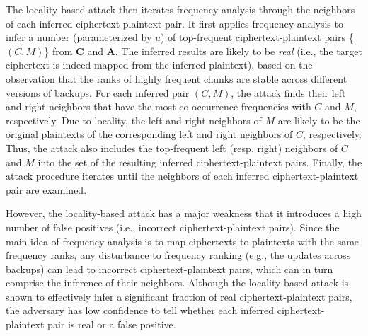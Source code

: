 \documentclass[bachelor]{thesis-uestc}
\begin{document}
The locality-based attack then iterates frequency analysis through the
neighbors of each inferred ciphertext-plaintext pair.  It first applies
frequency analysis to infer a number (parameterized by $u$) of top-frequent
ciphertext-plaintext pairs \{$(C, M)$\} from $\mathbf{C}$ and $\mathbf{A}$.
The inferred results are likely to be {\em real} (i.e., the target ciphertext
is indeed mapped from the inferred plaintext), based on the observation that
the ranks of highly frequent chunks are stable across different versions of
backups.  For each inferred pair $(C, M)$, the attack finds their left and
right neighbors that have the most co-occurrence frequencies with $C$ and $M$,
respectively.  Due to locality, the left and right neighbors of $M$ are likely
to be the original plaintexts of the corresponding left and right neighbors of
$C$, respectively.  Thus, the attack also includes the top-frequent left
(resp. right) neighbors of $C$ and $M$ into the set of the resulting inferred
ciphertext-plaintext pairs.  Finally, the attack procedure iterates until the
neighbors of each inferred ciphertext-plaintext pair are examined. 



However, the locality-based attack has a major weakness that it  introduces
a high number of false positives (i.e., incorrect ciphertext-plaintext pairs).
Since the main idea of frequency analysis is to map ciphertexts to plaintexts
with the same frequency ranks, any disturbance to frequency ranking (e.g., 
the updates across backups) can lead to incorrect ciphertext-plaintext pairs,
which can in turn comprise the inference of their neighbors.  Although the
locality-based attack is shown to effectively infer a significant fraction of
real ciphertext-plaintext pairs,  the adversary has low confidence to tell
whether each inferred ciphertext-plaintext pair is real or a false positive.  
\end{document}
